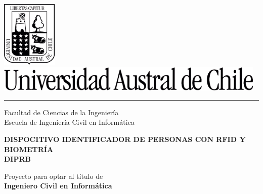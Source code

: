\documentclass[12pt]{article}
\newcommand{\blockline}{\par\noindent\hspace{-0.05\textwidth}%
    \textcolor{black}{\rule{1.05\textwidth}{0.35mm}}\par\nobreak}
\begin{document}

\thispagestyle{empty}
\setcounter{page}{1}
\begin{spacing}{1.0}

\begin{center}
\includegraphics[width=2.65cm, height=3.18cm]{images/portada/escudo.png}\\
\vspace{0.5cm}
\includegraphics[width=13.02cm, height=1.23cm]{images/portada/uach.png}\\
\vspace{-0.4cm}
\blockline
\vspace{0.2cm}
{\fontsize{24}{24}\selectfont Facultad de Ciencias de la Ingeniería}\\[0.1cm]
{\fontsize{18}{18}\selectfont Escuela de Ingeniería Civil en Informática}\\
\end{center}

\vspace{3.0cm}

\begin{center}
{\fontsize{18}{18}\selectfont \bf DISPOCITIVO IDENTIFICADOR DE PERSONAS CON RFID Y BIOMETRÍA}\\[0.5cm]
{\fontsize{18}{18}\selectfont \bf DIPRB}\\
\end{center}

\vspace{3.0cm}

\begin{flushright} \small
{\fontsize{10}{10}\selectfont Proyecto para optar al título de}  \textcolor{white}{.}\\
{\fontsize{10}{10}\selectfont \bf Ingeniero Civil en Informática} 
\end{flushright}

\vspace{1.0cm}


\end{spacing}
\end{document}
